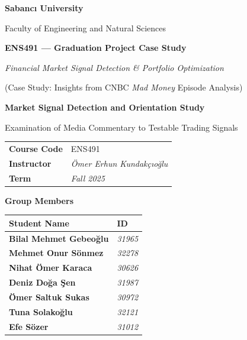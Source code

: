 \documentclass[12pt,a4paper]{article}
\begin{document}
\thispagestyle{empty}
\begin{titlepage}
    \centering

    {\Large\bfseries \textcolor{SUblue}{Sabancı University}}\par
    \vspace{0.15cm}
    {\large Faculty of Engineering and Natural Sciences}\par
    \vspace{1.2cm}

    {\large \textbf{ENS491 — Graduation Project Case Study}}\par
    \vspace{0.25cm}
    {\normalsize \textit{Financial Market Signal Detection \& Portfolio Optimization}}\par
    \vspace{0.1cm}
    {\normalsize (Case Study: Insights from CNBC \textit{Mad Money} Episode Analysis)}\par

    \vspace{1.5cm}
    {\large\bfseries 
        Market Signal Detection and Orientation Study
    }\par
    \vspace{0.3cm}
    {\large Examination of Media Commentary to Testable Trading Signals}\par

    \vspace{1.6cm}
    \renewcommand{\arraystretch}{1.3}
    \begin{tabular}{>{\bfseries}p{3.5cm} p{10cm}}
        Course Code & ENS491 \\
        Instructor  & \textit{Ömer Erhun Kundakçıoğlu}\\
        Term        & \textit{Fall 2025} \\
    \end{tabular}

    \vspace{2cm}

    {\large\bfseries Group Members}\par
    \vspace{0.5cm}
    \begin{tabularx}{\textwidth}{>{\bfseries}p{6cm} X}
    \textbf{Student Name} & \textbf{ID} \\
    \hline
    Bilal Mehmet Gebeoğlu & \textit{31965} \\
    Mehmet Onur Sönmez    & \textit{32278} \\
    Nihat Ömer Karaca     & \textit{30626} \\
    Deniz Doğa Şen        & \textit{31987} \\
    Ömer Saltuk Sukas     & \textit{30972} \\
    Tuna Solakoğlu        & \textit{32121} \\
    Efe Sözer             & \textit{31012} \\
\end{tabularx}


\end{titlepage}
\end{document}
